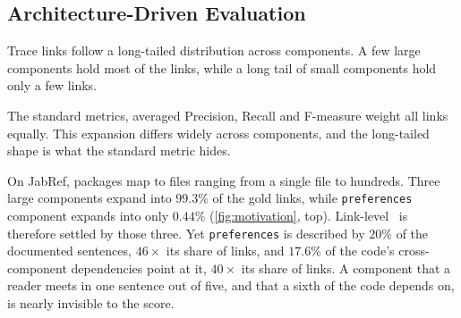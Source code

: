 \subsection{Architecture-Driven Evaluation}

Trace links follow a long-tailed distribution across components.
A few large components hold most of the links, while a long tail of small components hold only a few links.

The standard metrics, averaged Precision, Recall and F-measure weight all links equally.
This expansion differs widely across components, and the long-tailed shape is what the standard metric hides.

On JabRef, packages map to files ranging from a single file to hundreds.
Three large components expand into $99.3\%$ of the gold links, while
\texttt{preferences} component expands into only $0.44\%$ (\autoref{fig:motivation}, top).
Link-level \fone\ is therefore settled by those three.
Yet \texttt{preferences} is described by $20\%$ of the documented sentences, $46\times$ its
share of links, and $17.6\%$ of the code's cross-component dependencies point at it, $40\times$ its share of links.
A component that a reader meets in one sentence out of five, and that a sixth of the code depends on, is nearly invisible to the score.

